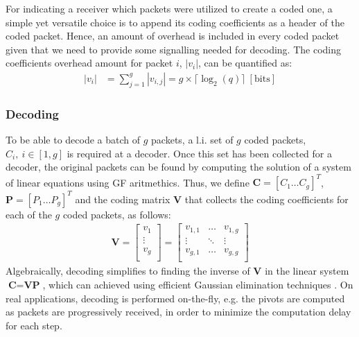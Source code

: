 For indicating a receiver which packets were utilized
to create a coded one, a simple yet versatile choice is to append
its coding coefficients as a header of the coded packet. Hence, an
amount of overhead is included in every coded packet given that we
need to provide some signalling needed for decoding. The coding
coefficients overhead amount for packet $i$, $|v_i|$, can be quantified
as:
%
\begin{align} \label{eq:coded_packet_coef}
|v_i| &= \sum_{j=1}^{g} |v_{i,j}| = g \times \lceil \log_{2} (q)
\rceil ~ [\mathrm{bits}]
\end{align}

\subsubsection{Decoding}
\label{sssec:decoding}
To be able to decode a batch of $g$ packets, a \ac{l.i.} set of $g$
coded packets, $C_i,\ i \in [1,g]$ is required at a decoder.
Once this set has been collected for a decoder,
the original packets can be found by computing the solution of a system
of linear equations using \ac{GF} aritmethics. Thus, we define
$\textbf{C} = \left[C_1 \ldots C_g \right]^T$,
$\textbf{P} = \left[P_1 \ldots P_g \right]^T$ and the coding matrix
$\textbf{V}$ that collects the coding coefficients for each of the $g$
coded packets, as follows:
%
\begin{align} \label{eq:coding_matrix}
\textbf{V} =
\left[
\begin{array}{c}
        v_1    \\ \hline
        \vdots \\ \hline
        v_g    \\
\end{array}
\right]
=
\left[
\begin{array}{ccc}
        v_{1,1} & \ldots & v_{1,g} \\
        \vdots  & \ddots & \vdots  \\
        v_{g,1} & \ldots & v_{g,g} \\
\end{array}
\right]
\end{align}
%
Algebraically, decoding simplifies to finding the inverse of
$\textbf{V}$ in the linear system
$\textbf{C} = \textbf{V} \textbf{P}$, which can achieved using
efficient Gaussian elimination techniques \cite{fragouli2006network}.
On real applications, decoding is performed on-the-fly, e.g. the pivots are
computed as packets are progressively received, in order to minimize the
computation delay for each step.

